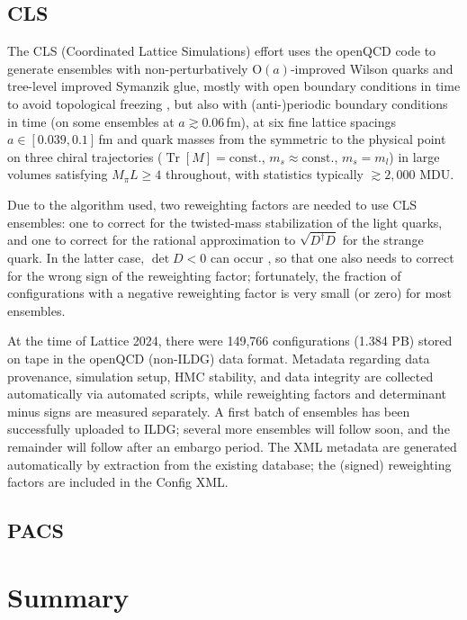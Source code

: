 \documentclass[a4paper,11pt]{article}
\begin{document}
\subsection{CLS}
The CLS (Coordinated Lattice Simulations) effort uses the openQCD code
\cite{openqcd} to generate ensembles
\cite{Bruno:2014jqa,Mohler:2017wnb} with  non-perturbatively
$\mathrm{O}(a)$-improved Wilson quarks and tree-level improved
Symanzik glue, mostly with open boundary conditions in time to avoid
topological freezing \cite{Schaefer:2010hu,Luscher:2012av}, but also
with (anti-)periodic boundary conditions in time (on some ensembles at
$a\gtrsim 0.06\,$fm), at six fine lattice spacings
$a\in[0.039,0.1]$\,fm and quark masses from the symmetric to the
physical point on three chiral trajectories
($\mathop{\mathrm{Tr}}[M]=\mathrm{const.}$,
$m_s\approx\mathrm{const.}$, $m_s=m_l$) in large volumes satisfying
$M_\pi L\ge4$ throughout, with statistics typically $\gtrsim 2,000$
MDU.

Due to the algorithm used, two reweighting factors are needed to use
CLS ensembles: one to correct for the twisted-mass stabilization of
the light quarks, and one to correct for the rational approximation to
$\sqrt{D^{\dagger}D}$ for the strange quark.  In the latter case,
$\det D<0$ can occur \cite{Mohler:2020txx}, so that one also needs to
correct for the wrong sign of the reweighting factor; fortunately, the
fraction of configurations with a negative reweighting factor is very
small (or zero) for most ensembles.

At the time of Lattice 2024, there were 149,766 configurations (1.384
PB) stored on tape in the openQCD (non-ILDG) data format.  Metadata
regarding data provenance, simulation setup, HMC stability, and data
integrity are collected automatically via automated scripts, while
reweighting factors and determinant minus signs are measured
separately.  A first batch of ensembles has been successfully uploaded
to ILDG; several more ensembles will follow soon, and the remainder
will follow after an embargo period.  The XML metadata are generated
automatically by extraction from the existing database; the (signed)
reweighting factors are included in the Config XML.

\subsection{PACS}

\section{Summary}
\end{document}
